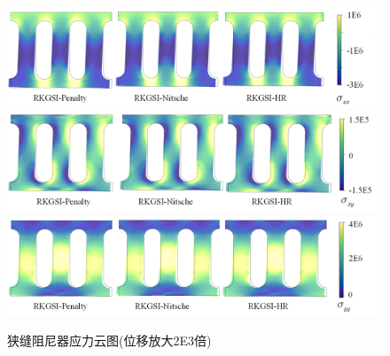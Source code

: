 \begin{figure}[H]
    \centering
        \includegraphics[scale=0.55]{figure/DAMPER/slit/M11.png}
        \includegraphics[scale=0.55]{figure/DAMPER/slit/M12.png}
        \includegraphics[scale=0.55]{figure/DAMPER/slit/M22.png}
    \caption{狭缝阻尼器应力云图(位移放大2E3倍)}\label{slitM}
\end{figure}
